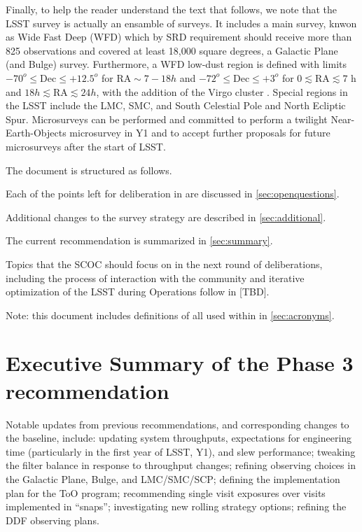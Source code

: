Finally, to help the reader understand the text that follows, we note that the LSST survey is actually an ensamble of surveys. It includes a main survey, knwon as Wide Fast Deep (WFD) which by SRD requirement should receive more than 825 observations and covered at least 18,000 square degrees, a Galactic Plane (and Bulge) survey. Furthermore, a WFD low-dust region is defined with limits $-70^o \leq \mathrm{Dec} \leq +12.5^o$ for 
$\mathrm{RA} \sim   7-18 h$ and $-72^o \leq \mathrm{Dec}\leq +3^o$
for $0 \lesssim \mathrm{RA} \lesssim 7$ h and $18 h \lesssim \mathrm{RA} \lesssim 24 h$, with the addition of the Virgo cluster .  Special regions in the LSST include the LMC, SMC, and South Celestial Pole and North Ecliptic Spur. Microsurveys can be performed and  committed to perform a twilight Near-Earth-Objects microsurvey in Y1 and to accept further proposals for future microsurveys after the start of LSST.

The document is structured as follows.


Each of the points left for deliberation in   are discussed in \autoref{sec:openquestions}. 

Additional changes to the survey strategy are described in \autoref{sec:additional}. 

The current recommendation is summarized in \autoref{sec:summary}.

Topics that the SCOC should focus on in the next round of deliberations, including the process of interaction with the community and iterative optimization of the LSST during Operations follow in [TBD].%

Note: this document includes definitions of all  used within in \autoref{sec:acronyms}.

\clearpage

\section{Executive Summary of the Phase 3 recommendation}

Notable updates from previous recommendations, and corresponding changes to the baseline, include: updating system throughputs,  expectations for engineering time (particularly in the first year of LSST, Y1), and slew performance; tweaking the filter balance in response to throughput changes; refining observing choices in the Galactic Plane, Bulge, and LMC/SMC/SCP; defining the implementation plan for the ToO program; recommending single visit exposures over visits implemented in ``snaps''; investigating new rolling strategy options; refining the DDF observing plans.

